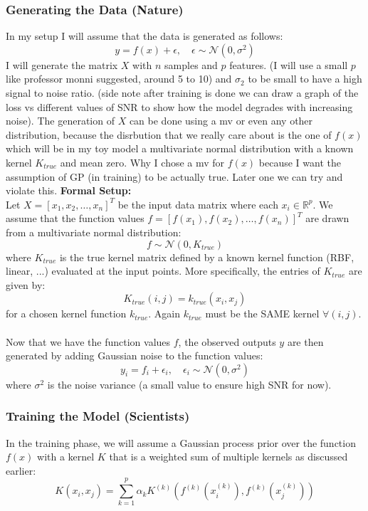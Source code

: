 \documentclass[12pt]{article}
\begin{document}
\subsubsection*{Generating the Data (Nature)}
In my setup I will assume that the data is generated as follows: 
\[
y = f(x) + \epsilon , \quad \epsilon \sim \mathcal{N}(0, \sigma^2)
\]
I will generate the matrix $X$ with $n$ samples and $p$ features. (I will use a small $p$ like professor monni suggested, around 5 to 10) and $\sigma_2$ to be small to have a high signal to noise ratio. (side note after training is done we can draw a graph of the loss vs different values of SNR to show how the model degrades with increasing noise). The generation of $X$ can be done using a mv or even any other distribution, because the disrbution that we really care about is the one of $f(x)$ which will be in my toy model a multivariate normal distribution with a known kernel $K_{true}$ and mean zero. Why I chose a mv for $f(x)$ because I want the assumption of GP (in training) to be actually true. Later one we can try and violate this. \textbf{Formal Setup:}\\
Let $X = [x_1, x_2, \ldots, x_n]^T$ be the input data matrix where each $x_i \in \mathbb{R}^p$. We assume that the function values $f = [f(x_1), f(x_2), \ldots, f(x_n)]^T$ are drawn from a multivariate normal distribution:
\[f \sim \mathcal{N}(0, K_{true})\]
where $K_{true}$ is the true kernel matrix defined by a known kernel function (RBF, linear, ...) evaluated at the input points.  More specifically, the entries of $K_{true}$ are given by:
\[K_{true}(i,j) = k_{true}(x_i, x_j)\]
for a chosen kernel function $k_{true}$. Again $k_{true}$ must be the SAME kernel $\forall (i,j)$. \\ \\
Now that we have the function values $f$, the observed outputs $y$ are then generated by adding Gaussian noise to the function values:
\[y_i = f_i + \epsilon_i, \quad \epsilon_i \sim \mathcal{N}(0, \sigma^2)\]
where $\sigma^2$ is the noise variance (a small value to ensure high SNR for now).

\subsubsection*{Training the Model (Scientists)}
In the training phase, we will assume a Gaussian process prior over the function $f(x)$ with a kernel $K$ that is a weighted sum of multiple kernels as discussed earlier:
\[K(x_i, x_j) = \sum_{k=1}^{p} \alpha_k K^{(k)}(f^{(k)}(x_i^{(k)}), f^{(k)}(x_j^{(k)}))\]
\end{document}
